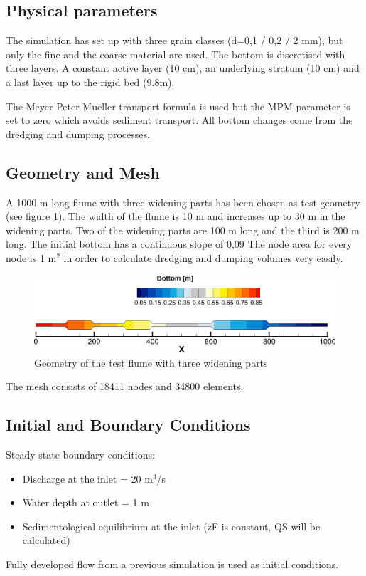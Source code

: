 %
%
\subsection{Physical parameters}
%
The simulation has set up with three grain classes (d=0,1 / 0,2 / 2 mm), but only the fine and the coarse material
are used. The bottom is discretised with three layers. A constant active layer (10 cm), an underlying stratum (10 cm)
and a last layer up to the rigid bed (9.8m).

The Meyer-Peter Mueller transport formula is used but the MPM parameter is set to zero which avoids sediment transport.
All bottom changes come from the dredging and dumping processes.
%
%
\subsection{Geometry and Mesh}
%
A 1000 m long flume with three widening parts has been chosen as test geometry (see figure \ref{ini}).
The width of the flume is 10 m and increases up to 30 m in the widening parts.
Two of the widening parts are 100 m long and the third is 200 m long.
The initial bottom has a continuous slope of 0,09 %
The node area for every node is 1 m$^2$ in order to calculate dredging and dumping volumes very easily.

\begin{figure} [!h]
\centering
\includegraphics[scale=0.15]{../img/ini_bottom.png}
 \caption{Geometry of the test flume with three widening parts}\label{ini}
\end{figure}
The mesh consists of 18411 nodes and 34800 elements.

%
%
\subsection{Initial and Boundary Conditions}
%
Steady state boundary conditions:
\begin{itemize}
\item{ Discharge at the inlet = 20 m$^3$/s}
\item Water depth at outlet = 1 m
\item Sedimentological equilibrium at the inlet (zF is constant, QS will be calculated)
\end{itemize}
Fully developed flow from a previous simulation is used as initial conditions.

